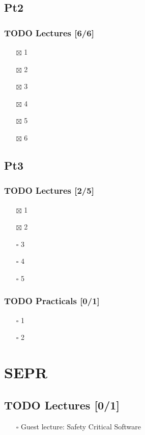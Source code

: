 \documentclass[11pt]{article}
\begin{document}
\subsection{Pt2}
\label{sec:org2759702}
\subsubsection{{\bfseries\sffamily TODO} Lectures [6/6]}
\label{sec:org0bca197}
\begin{itemize}
\item[{$\boxtimes$}] 1
\item[{$\boxtimes$}] 2
\item[{$\boxtimes$}] 3
\item[{$\boxtimes$}] 4
\item[{$\boxtimes$}] 5
\item[{$\boxtimes$}] 6
\end{itemize}
\subsection{Pt3}
\label{sec:org8040961}
\subsubsection{{\bfseries\sffamily TODO} Lectures [2/5]}
\label{sec:orgae74ac7}
\begin{itemize}
\item[{$\boxtimes$}] 1
\item[{$\boxtimes$}] 2
\item[{$\square$}] 3
\item[{$\square$}] 4
\item[{$\square$}] 5
\end{itemize}
\subsubsection{{\bfseries\sffamily TODO} Practicals [0/1]}
\label{sec:org84d929d}
\begin{itemize}
\item[{$\square$}] 1
\item[{$\square$}] 2
\end{itemize}
\section{SEPR}
\label{sec:orgf0f3cfd}
\subsection{{\bfseries\sffamily TODO} Lectures [0/1]}
\label{sec:org4d08631}
\begin{itemize}
\item[{$\square$}] Guest lecture: Safety Critical Software
\end{itemize}
\end{document}
